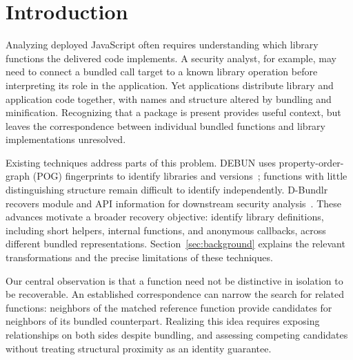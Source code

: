 \section{Introduction}
Analyzing deployed JavaScript often requires understanding which library functions the delivered code implements. A security analyst, for example, may need to connect a bundled call target to a known library operation before interpreting its role in the application. Yet applications distribute library and application code together, with names and structure altered by bundling and minification. Recognizing that a package is present provides useful context, but leaves the correspondence between individual bundled functions and library implementations unresolved.

Existing techniques address parts of this problem. DEBUN uses property-order-graph (POG) fingerprints to identify libraries and versions~\cite{kim2025debun}; functions with little distinguishing structure remain difficult to identify independently. D-Bundlr recovers module and API information for downstream security analysis~\cite{xu2026dbundlr}. These advances motivate a broader recovery objective: identify library definitions, including short helpers, internal functions, and anonymous callbacks, across different bundled representations. Section~\ref{sec:background} explains the relevant transformations and the precise limitations of these techniques.

Our central observation is that a function need not be distinctive in isolation to be recoverable. An established correspondence can narrow the search for related functions: neighbors of the matched reference function provide candidates for neighbors of its bundled counterpart. Realizing this idea requires exposing relationships on both sides despite bundling, and assessing competing candidates without treating structural proximity as an identity guarantee.

